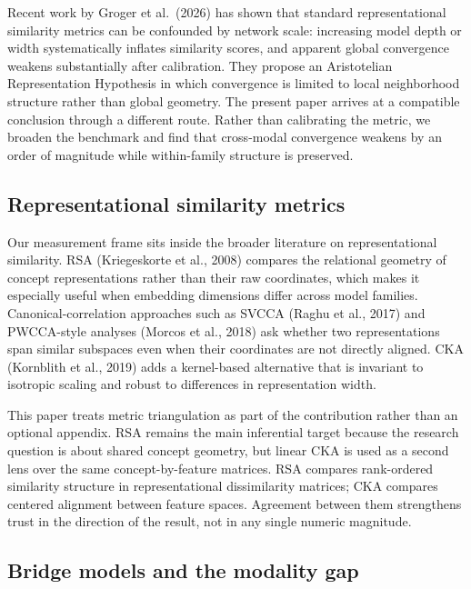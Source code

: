 \documentclass[10pt]{article}
\begin{document}
Recent work by Groger et al.~(2026) has shown that standard
representational similarity metrics can be confounded by network scale:
increasing model depth or width systematically inflates similarity
scores, and apparent global convergence weakens substantially after
calibration. They propose an Aristotelian Representation Hypothesis in
which convergence is limited to local neighborhood structure rather than
global geometry. The present paper arrives at a compatible conclusion
through a different route. Rather than calibrating the metric, we
broaden the benchmark and find that cross-modal convergence weakens by
an order of magnitude while within-family structure is preserved.

\subsection{Representational similarity
metrics}\label{representational-similarity-metrics}

Our measurement frame sits inside the broader literature on
representational similarity. RSA (Kriegeskorte et al., 2008) compares
the relational geometry of concept representations rather than their raw
coordinates, which makes it especially useful when embedding dimensions
differ across model families. Canonical-correlation approaches such as
SVCCA (Raghu et al., 2017) and PWCCA-style analyses (Morcos et al.,
2018) ask whether two representations span similar subspaces even when
their coordinates are not directly aligned. CKA (Kornblith et al., 2019)
adds a kernel-based alternative that is invariant to isotropic scaling
and robust to differences in representation width.

This paper treats metric triangulation as part of the contribution
rather than an optional appendix. RSA remains the main inferential
target because the research question is about shared concept geometry,
but linear CKA is used as a second lens over the same concept-by-feature
matrices. RSA compares rank-ordered similarity structure in
representational dissimilarity matrices; CKA compares centered alignment
between feature spaces. Agreement between them strengthens trust in the
direction of the result, not in any single numeric magnitude.

\subsection{Bridge models and the modality
gap}\label{bridge-models-and-the-modality-gap}
\end{document}
